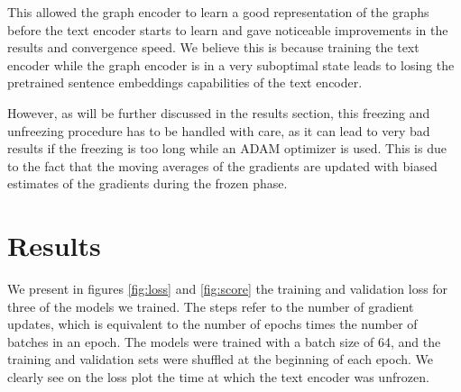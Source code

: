 \documentclass[switch, 11pt]{article}
\begin{document}
\begin{multicols}{2}
    This allowed the graph encoder to learn a good representation of the graphs before the text encoder starts to learn and gave noticeable improvements in the results and convergence speed. We believe this is because training the text encoder while the graph encoder is in a very suboptimal state leads to losing the pretrained sentence embeddings capabilities of the text encoder.

    However, as will be further discussed in the results section, this freezing and unfreezing procedure has to be handled with care, as it can lead to very bad results if the freezing is too long while an ADAM optimizer is used. This is due to the fact that the moving averages of the gradients are updated with biased estimates of the gradients during the frozen phase.

    \section{Results}

    We present in figures \ref{fig:loss} and \ref{fig:score} the training and validation loss for three of the models we trained. The steps refer to the number of gradient updates, which is equivalent to the number of epochs times the number of batches in an epoch. The models were trained with a batch size of 64, and the training and validation sets were shuffled at the beginning of each epoch. We clearly see on the loss plot the time at which the text encoder was unfrozen.

\end{multicols}
\end{document}
